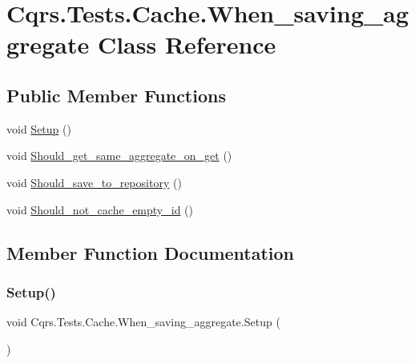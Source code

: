 \hypertarget{classCqrs_1_1Tests_1_1Cache_1_1When__saving__aggregate}{}\section{Cqrs.\+Tests.\+Cache.\+When\+\_\+saving\+\_\+aggregate Class Reference}
\label{classCqrs_1_1Tests_1_1Cache_1_1When__saving__aggregate}
\subsection*{Public Member Functions}
\begin{DoxyCompactItemize}
\item 
void \hyperlink{classCqrs_1_1Tests_1_1Cache_1_1When__saving__aggregate_ae3cdfe47b998fc0e76ffc9c9b125c441}{Setup} ()
\item 
void \hyperlink{classCqrs_1_1Tests_1_1Cache_1_1When__saving__aggregate_a7b8f4858d610b1db41b395516b1dc72b}{Should\+\_\+get\+\_\+same\+\_\+aggregate\+\_\+on\+\_\+get} ()
\item 
void \hyperlink{classCqrs_1_1Tests_1_1Cache_1_1When__saving__aggregate_affc34709b78fecd91d555de42344d2ed}{Should\+\_\+save\+\_\+to\+\_\+repository} ()
\item 
void \hyperlink{classCqrs_1_1Tests_1_1Cache_1_1When__saving__aggregate_ae5d0ee92c05898125cc5046fbea0a654}{Should\+\_\+not\+\_\+cache\+\_\+empty\+\_\+id} ()
\end{DoxyCompactItemize}


\subsection{Member Function Documentation}
\mbox{\label{classCqrs_1_1Tests_1_1Cache_1_1When__saving__aggregate_ae3cdfe47b998fc0e76ffc9c9b125c441}} 
\subsubsection{\texorpdfstring{Setup()}{Setup()}}
{\footnotesize\ttfamily void Cqrs.\+Tests.\+Cache.\+When\+\_\+saving\+\_\+aggregate.\+Setup (\begin{DoxyParamCaption}{ }\end{DoxyParamCaption})}

